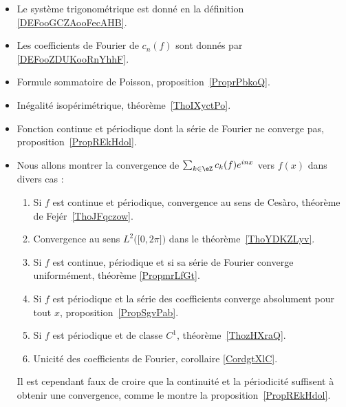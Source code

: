        \label{THMooHWEBooTMInve}
\begin{itemize}
	\item Le système trigonométrique est donné en la définition \ref{DEFooGCZAooFecAHB}.
	\item Les coefficients de Fourier de \( c_n(f)\) sont donnés par \ref{DEFooZDUKooRnYhhF}.
	\item Formule sommatoire de Poisson, proposition~\ref{ProprPbkoQ}.
	\item Inégalité isopérimétrique, théorème~\ref{ThoIXyctPo}.
	\item Fonction continue et périodique dont la série de Fourier ne converge pas, proposition~\ref{PropREkHdol}.

	\item
	      Nous allons montrer la convergence de \( \sum_{k\in \eZ}c_k(f) e^{inx}\) vers \( f(x)\) dans divers cas :
	      \begin{enumerate}
		      \item
		            Si \( f\) est continue et périodique, convergence au sens de Cesàro, théorème de Fejér~\ref{ThoJFqczow}.
		      \item
		            Convergence au sens \( L^2\Big( \mathopen[ 0 , 2\pi \mathclose] \Big)\) dans le théorème~\ref{ThoYDKZLyv}.
		      \item
		            Si \( f\) est continue, périodique et si sa série de Fourier converge uniformément, théorème \ref{PropmrLfGt}.
		      \item
		            Si \( f\) est périodique et la série des coefficients converge absolument pour tout \( x\), proposition~\ref{PropSgvPab}.
		      \item
		            Si \( f\) est périodique et de classe \( C^1\), théorème~\ref{ThozHXraQ}.
		      \item
		            Unicité des coefficients de Fourier, corollaire \ref{CordgtXlC}.
	      \end{enumerate}
	      Il est cependant faux de croire que la continuité et la périodicité suffisent à obtenir une convergence, comme le montre la proposition~\ref{PropREkHdol}.
\end{itemize}
